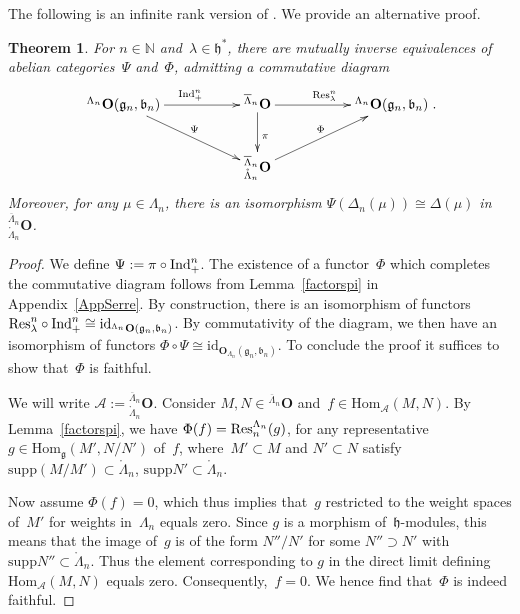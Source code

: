 \documentclass[11pt]{amsart}
\newcommand{\supp}{\mathrm{supp}}
\newcommand{\bO}{\mathbf{O}}
\newcommand{\id}{\mathrm{id}}
\newcommand{\Hom}{\mathrm{Hom}}
\newcommand{\cA}{\mathcal{A}}
\newcommand{\fg}{\mathfrak{g}}
\newcommand{\fh}{\mathfrak{h}}
\newcommand{\fb}{\mathfrak{b}}
\newcommand{\mN}{\mathbb{N}}
\numberwithin{equation}{section}
\theoremstyle{plain}
\newtheorem{thm}[subsubsection]{Theorem}
\theoremstyle{remark}
\theoremstyle{remark}
\theoremstyle{construction}
\newcommand{\ind}{{\rm Ind}}
\newcommand{\res}{{\rm Res}}
\begin{document}
The following is an infinite rank version of \cite[Theorem~32]{CMZ}. We provide an alternative proof. 
\begin{thm}\label{ThmEquiv}
For $n\in\mN$ and~$\lambda\in\fh^\ast$, {there are} mutually inverse equivalences of abelian categories~$\Psi$ and~$\Phi$, admitting a {commutative} diagram
$$
\xymatrix{
{}^{\Lambda_n}\bO({\fg_n},\fb_n)\ar[rr]^{\ind^n_+}\ar[drr]^{\Psi}&&{}^{\overline{\Lambda}_n}\bO\ar[rr]^{\res_\lambda^n}\ar[d]^{\pi}&&{}^{\Lambda_n}\bO({\fg_n},\fb_n)\\
&&{}^{\overline{\Lambda}_n}_{\mathring{\Lambda}_n}\bO\ar[rru]^{\Phi}
}{.}
$$
Moreover, for any $\mu\in {\Lambda_n}$, {there is an isomorphism} $\Psi(\Delta_n(\mu))\cong\Delta(\mu)$ in~${}^{\overline{\Lambda}_n}_{\mathring{\Lambda}_n}\bO$.
\end{thm}
\begin{proof}
 We define $\Psi:=\pi\circ\ind^n_+$. The existence of a functor~$\Phi$ which completes the {commutative} diagram follows from Lemma~\ref{factorspi} in Appendix~\ref{AppSerre}. By construction, {there is an isomorphism of functors} $\res_\lambda^n\circ\ind^n_+\cong\id_{{}^{\Lambda_n}\bO({\fg_n},\fb_n)}$. By commutativity of the diagram, we then have {an isomorphism of functors} $\Phi\circ\Psi\cong\id_{\bO_{{\Lambda_n}}({\fg_n},\fb_n)}$. To conclude the proof it suffices to show that~$\Phi$ is faithful. 

We will write $\cA:={}^{\overline{\Lambda}_n}_{\mathring{\Lambda}_n}\bO$.
Consider $M,N\in {}^{\overline{\Lambda}_n}\bO$ and~$f\in \Hom_{\cA}(M,N)$. %
By Lemma~\ref{factorspi}, we have
$\Phi(f)=\res^{\Lambda_n}_n(g)$, for any representative $g\in \Hom_{\fg}(M',N/N')$ of~$f$, where~$M'\subset M$ { and $N'\subset N$ satisfy $\supp (M/M')\subset{\mathring{\Lambda}_n}$, $\supp N'\subset {\mathring{\Lambda}_n}$}. 

Now assume $\Phi(f)=0$, which thus
 implies that~$g$ restricted to the weight spaces of~$M'$ for weights in~${\Lambda_n}$ {equals} zero. Since $g$ is a morphism of~$\fh$-modules{,} this means that the image of~$g$ is of the form $N''/N'$ for some $N''\supset N'$ with $\supp N''\subset \mathring{\Lambda}_n$. Thus {the element corresponding to $g$ }
 in the direct limit defining $\Hom_{\cA}(M,N)$ { equals zero}. {Consequently,}~$f=0$. We hence find that~$\Phi$ is indeed faithful. 
 \end{proof}
\end{document}
